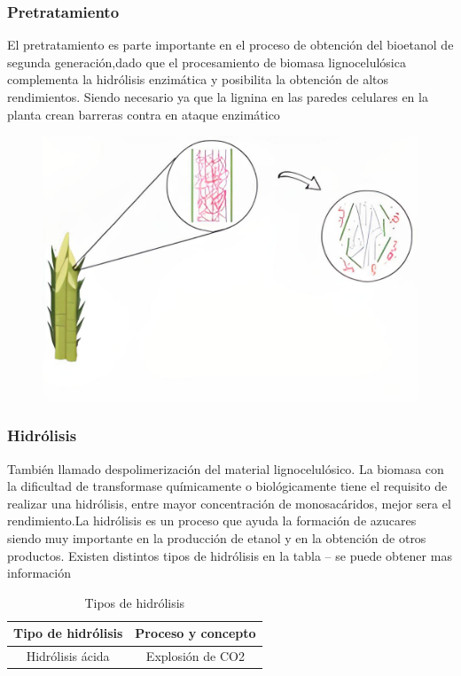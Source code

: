 \documentclass[12pt]{article}
\begin{document}
\begin{appendix}
		\subsubsection{Pretratamiento}
		
		El pretratamiento es parte importante en el proceso de obtención del bioetanol de segunda generación,dado que el procesamiento de biomasa lignocelulósica complementa la hidrólisis enzimática y posibilita la obtención de altos rendimientos. Siendo necesario ya que la lignina en las paredes celulares en la planta crean barreras contra en ataque enzimático %
		\newline 
		
		\begin{figure}[H]
			\centering
			\includegraphics[width=0.4\linewidth]{imagenes/pretrata_1}
			\caption[Efecto del pretratamiento de biomasa ligno- celulósica]{}
			\label{fig:pretrata1}
		\end{figure}
		
		
		\subsubsection{Hidrólisis}
		También llamado despolimerización del material lignocelulósico. La biomasa con la dificultad de transformase químicamente  o biológicamente tiene el requisito de realizar una hidrólisis, entre mayor concentración de monosacáridos, mejor sera el rendimiento.La hidrólisis es un proceso que ayuda la formación de azucares siendo muy importante en la producción de etanol y en la obtención de otros productos. Existen distintos tipos de hidrólisis en la tabla -- se puede obtener mas información  
		
		\begin{table}[H]
			\centering  
			\caption{Tipos de hidrólisis }%
		\begin{tabular}{  | c | c |}
			\hline \textbf{Tipo de hidrólisis} &\textbf{ Proceso y concepto}\\ \hline 
			Hidrólisis ácida   &   Explosión de CO2  \\ 
			

\end{tabular}
\end{table}
\end{appendix}
\end{document}
